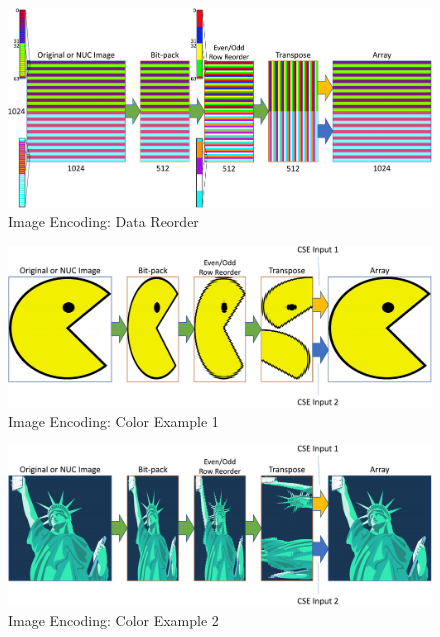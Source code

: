     \begin{figure}
        \centering
        \includegraphics[trim=0in 0in 0in 0in,width=1.0\textwidth]{fig/image_encoding_reorder.pdf}
        \caption{Image Encoding: Data Reorder}
        \label{fig:image_encoding_bitpack_reorder}
    \end{figure}

    \begin{figure}
        \centering
        \includegraphics[trim=0in 0in 0in 0in,width=1.0\textwidth]{fig/image_encoding_pac.pdf}
        \caption{Image Encoding: Color Example 1}
        \label{fig:image_encoding_color_example1}
    \end{figure}

    \begin{figure}
        \centering
        \includegraphics[trim=0in 0in 0in 0in,width=1.0\textwidth]{fig/image_encoding_liberty.pdf}
        \caption{Image Encoding: Color Example 2}
        \label{fig:image_encoding_color_example2}
    \end{figure}

